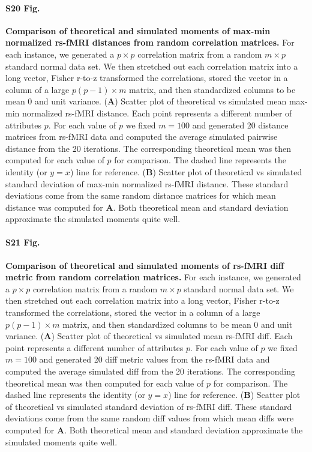 \documentclass[10pt,letterpaper]{article}
\begin{document}
\paragraph*{S20 Fig.}
\label{S20_Fig}
{\bf Comparison of theoretical and simulated moments of max-min normalized rs-fMRI distances from random correlation matrices.} For each instance, we generated a $p \times p$ correlation matrix from a random $m \times p$ standard normal data set. We then stretched out each correlation matrix into a long vector, Fisher r-to-z transformed the correlations, stored the vector in a column of a large $p(p-1) \times m$ matrix, and then standardized columns to be mean 0 and unit variance. (\textbf{A}) Scatter plot of theoretical vs simulated mean max-min normalized rs-fMRI distance. Each point represents a different number of attributes $p$. For each value of $p$ we fixed $m=100$ and generated 20 distance matrices from rs-fMRI data and computed the average simulated pairwise distance from the 20 iterations. The corresponding theoretical mean was then computed for each value of $p$ for comparison. The dashed line represents the identity (or $y=x$) line for reference. (\textbf{B}) Scatter plot of theoretical vs simulated standard deviation of max-min normalized rs-fMRI distance. These standard deviations come from the same random distance matrices for which mean distance was computed for \textbf{A}. Both theoretical mean and standard deviation approximate the simulated moments quite well.

\paragraph*{S21 Fig.}
\label{S21_Fig}
{\bf Comparison of theoretical and simulated moments of rs-fMRI diff metric from random correlation matrices.} For each instance, we generated a $p \times p$ correlation matrix from a random $m \times p$ standard normal data set. We then stretched out each correlation matrix into a long vector, Fisher r-to-z transformed the correlations, stored the vector in a column of a large $p(p-1) \times m$ matrix, and then standardized columns to be mean 0 and unit variance. (\textbf{A}) Scatter plot of theoretical vs simulated mean rs-fMRI diff. Each point represents a different number of attributes $p$. For each value of $p$ we fixed $m=100$ and generated 20 diff metric values from the rs-fMRI data and computed the average simulated diff from the 20 iterations. The corresponding theoretical mean was then computed for each value of $p$ for comparison. The dashed line represents the identity (or $y=x$) line for reference. (\textbf{B}) Scatter plot of theoretical vs simulated standard deviation of rs-fMRI diff. These standard deviations come from the same random diff values from which mean diffs were computed for \textbf{A}. Both theoretical mean and standard deviation approximate the simulated moments quite well.
\end{document}
